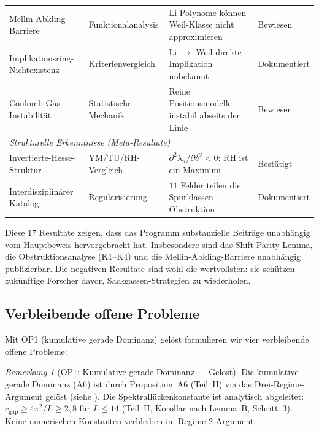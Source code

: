 \documentclass[12pt,a4paper]{article}
\theoremstyle{definition}
\theoremstyle{remark}
\newtheorem{remark}[theorem]{Bemerkung}
\begin{document}
\begin{center}
{\begin{tabular}{p{4.2cm}|p{3.2cm}|p{4.2cm}|l}
Mellin-Abkling-Barriere & Funktionalanalysis & Li-Polynome können Weil-Klasse nicht approximieren & Bewiesen \\
Implikationsring-Nichtexistenz & Kriterienvergleich & Li $\to$ Weil direkte Implikation unbekannt & Dokumentiert \\
Coulomb-Gas-Instabilität & Statistische Mechanik & Reine Positionsmodelle instabil abseits der Linie & Bewiesen \\[4pt]
\multicolumn{4}{l}{\emph{Strukturelle Erkenntnisse (Meta-Resultate)}} \\[2pt]
Invertierte-Hesse-Struktur & YM/TU/RH-Vergleich & $\partial^2\lambda_n/\partial\delta^2 < 0$: RH ist ein Maximum & Bestätigt \\
Interdisziplinärer Katalog & Regularisierung & $11$ Felder teilen die Spurklassen-Obstruktion & Dokumentiert
\end{tabular}}
\end{center}

\noindent Diese $17$ Resultate zeigen, dass das Programm substanzielle Beiträge unabhängig vom Hauptbeweis hervorgebracht hat. Insbesondere sind das Shift-Parity-Lemma, die Obstruktionsanalyse (K1--K4) und die Mellin-Abkling-Barriere unabhängig publizierbar. Die negativen Resultate sind wohl die wertvollsten: sie schützen zukünftige Forscher davor, Sackgassen-Strategien zu wiederholen.


\subsection{Verbleibende offene Probleme}

Mit OP1 (kumulative gerade Dominanz) gelöst formulieren wir vier verbleibende offene Probleme:

\begin{remark}[OP1: Kumulative gerade Dominanz --- Gelöst]
\label{rem:OP1-resolved}
Die kumulative gerade Dominanz (A6) ist durch Proposition~A6 (Teil~II) via das Drei-Regime-Argument gelöst (siehe ). Die Spektrallückenkonstante ist analytisch abgeleitet: $c_{\mathrm{gap}} \geq 4\pi^2/L \geq 2{,}8$ für $L \leq 14$ (Teil~II, Korollar nach Lemma~B, Schritt~3). Keine numerischen Konstanten verbleiben im Regime-2-Argument.
\end{remark}
\end{document}
